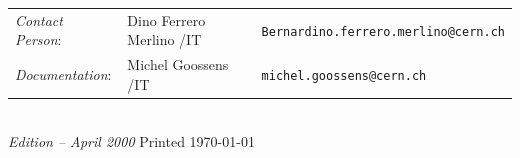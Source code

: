 {\vfill
\begin{flushleft}
\begin{tabular}{@{}l@{\quad}l@{\quad}l}
\emph{Contact Person}:& Dino Ferrero Merlino /IT    & 
                        \texttt{Bernardino.ferrero.merlino@cern.ch}\\
\emph{Documentation}: & Michel Goossens /IT         & 
                        \texttt{michel.goossens@cern.ch}
\end{tabular}\\[5mm]
\emph{Edition -- April 2000} \hfill \footnotesize Printed \today
\end{flushleft}
\newpage

\setcounter{page}{1}

\tableofcontents
\cleardoublepage
\setcounter{page}{1}
}
\endinput


